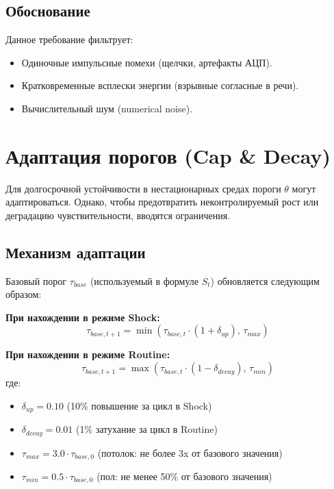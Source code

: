 \subsection{Обоснование}

Данное требование фильтрует:
\begin{itemize}
    \item Одиночные импульсные помехи (щелчки, артефакты АЦП).
    \item Кратковременные всплески энергии (взрывные согласные в речи).
    \item Вычислительный шум (numerical noise).
\end{itemize}

\section{Адаптация порогов (Cap \& Decay)}
\label{subsec:threshold_adaptation}

Для долгосрочной устойчивости в нестационарных средах пороги $\theta$ могут адаптироваться. Однако, чтобы предотвратить неконтролируемый рост или деградацию чувствительности, вводятся ограничения.

\subsection{Механизм адаптации}

Базовый порог $\tau_{base}$ (используемый в формуле $S_t$) обновляется следующим образом:

\textbf{При нахождении в режиме Shock:}
\begin{equation}
\tau_{base, t+1} = \min\left(\tau_{base, t} \cdot (1 + \delta_{up}), \, \tau_{max}\right)
\label{eq:threshold_up}
\end{equation}

\textbf{При нахождении в режиме Routine:}
\begin{equation}
\tau_{base, t+1} = \max\left(\tau_{base, t} \cdot (1 - \delta_{decay}), \, \tau_{min}\right)
\label{eq:threshold_decay}
\end{equation}
где:
\begin{itemize}
    \item $\delta_{up} = 0.10$ (10\% повышение за цикл в Shock)
    \item $\delta_{decay} = 0.01$ (1\% затухание за цикл в Routine)
    \item $\tau_{max} = 3.0 \cdot \tau_{base, 0}$ (потолок: не более 3x от базового значения)
    \item $\tau_{min} = 0.5 \cdot \tau_{base, 0}$ (пол: не менее 50\% от базового значения)
\end{itemize}

